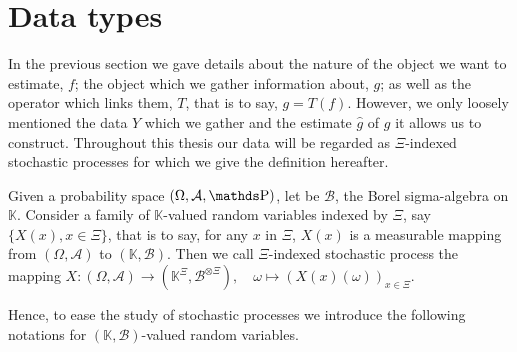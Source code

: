 \section{Data types}\label{INTRO_DATA}

In the previous section we gave details about the nature of the object we want to estimate, $f$; the object which we gather information about, $g$; as well as the operator which links them, $T$, that is to say, $g = T(f)$.
However, we only loosely mentioned the data $Y$ which we gather and the estimate $\widehat{g}$ of $g$ it allows us to construct.
Throughout this thesis our data will be regarded as $\Xi$-indexed stochastic processes for which we give the definition hereafter.

\begin{de}
Given a probability space $(\Omega, \mathcal{A}, \P)$, let be $\mathcal{B}$, the Borel sigma-algebra on $\mathds{K}$.
Consider a family of $\mathds{K}$-valued random variables indexed by $\Xi$, say $\{X(x), x \in \Xi \}$, that is to say, for any $x$ in $\Xi$, $X(x)$ is a measurable mapping from $(\Omega, \mathcal{A})$ to $(\mathds{K}, \mathcal{B})$.
Then we call $\Xi$-indexed stochastic process the mapping $X : (\Omega, \mathcal{A}) \rightarrow (\mathds{K}^{\Xi}, \mathcal{B}^{\otimes \Xi}), \quad \omega \mapsto (X(x)(\omega))_{x \in \Xi}$.
\assEnd
\end{de}

Hence, to ease the study of stochastic processes we introduce the following notations for $(\mathds{K}, \mathcal{B})$-valued random variables.

